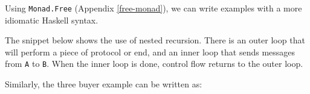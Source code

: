 \documentclass[runningheads,plain]{llncs}
\newenvironment{Shaded}{}{}
\newcommand{\KeywordTok}[1]{\textcolor[rgb]{0.00,0.44,0.13}{\textbf{#1}}}
\newcommand{\DataTypeTok}[1]{\textcolor[rgb]{0.56,0.13,0.00}{#1}}
\newcommand{\StringTok}[1]{\textcolor[rgb]{0.25,0.44,0.63}{#1}}
\newcommand{\CommentTok}[1]{\textcolor[rgb]{0.38,0.63,0.69}{\textit{#1}}}
\newcommand{\FunctionTok}[1]{\textcolor[rgb]{0.02,0.16,0.49}{#1}}
\newcommand{\NormalTok}[1]{#1}
\begin{document}
Using \texttt{Monad.Free} (Appendix \ref{free-monad}), we can write
examples with a more idiomatic Haskell syntax.

The snippet below shows the use of nested recursion. There is an outer
loop that will perform a piece of protocol or end, and an inner loop
that sends messages from \texttt{A} to \texttt{B}. When the inner loop
is done, control flow returns to the outer loop.

\begin{Shaded}
\end{Shaded}

Similarly, the three buyer example can be written as:
\end{document}
